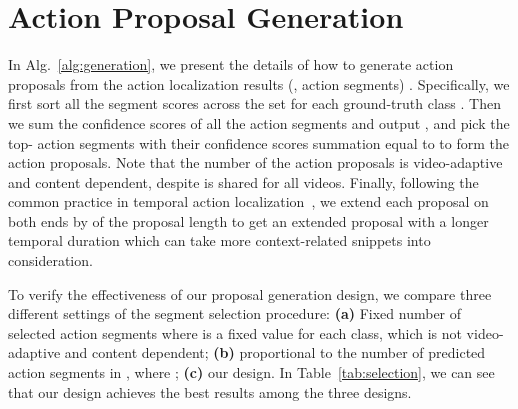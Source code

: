\section{Action Proposal Generation}
\label{sec:proposal}
\begin{table}[t]
\centering
\caption{Ablation on different action proposal selection methods.}
\vspace{-0.1in}
\label{tab:selection}
\end{table}

In Alg.~\ref{alg:generation}, we present the details of how to generate action proposals  from the action localization results (\ie, action segments) .
Specifically, we first sort all the segment scores across the set  for each ground-truth class . 
Then we sum the confidence scores of all the action segments and output , and pick the top- action segments with their confidence scores summation equal to  to form the action proposals.
Note that the number of the action proposals is video-adaptive and content dependent, despite  is shared for all videos.
Finally, following the common practice in temporal action localization~\cite{shou2017cdc,lin2018bsn,zeng2019graph,lin2020fast}, we extend each proposal on both ends by  of the proposal length to get an extended proposal with a longer temporal duration which can take more context-related snippets into consideration.

To verify the effectiveness of our proposal generation design, we compare three different settings of the segment selection procedure:
\textbf{(a)} Fixed number of selected action segments where  is a fixed value for each class, which is not video-adaptive and content dependent; 
\textbf{(b)}  proportional to the number of predicted action segments in , where ;
\textbf{(c)} our design.
In Table~\ref{tab:selection}, we can see that our design achieves the best results among the three designs.


